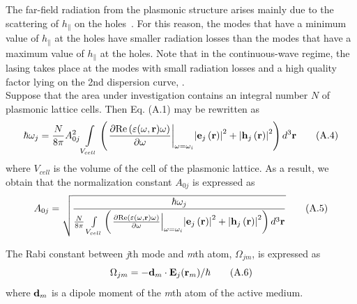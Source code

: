 \documentclass[aps,pra,amsmath,amssymb,onecolumn,superscriptaddress,showpacs,floatfix,]{revtex4-1}
\begin{document}
The far-field radiation from the plasmonic structure arises mainly due to the scattering of $h_{\parallel}$ on the holes~\cite{TennerJOpt}. 
For this reason, the modes that have a minimum value of $h_{\parallel}$ at the holes have smaller radiation losses than the modes that have a maximum value of $h_{\parallel}$ at the holes.
Note that in the continuous-wave regime, the lasing takes place at the modes with small radiation losses and a high quality factor lying on the 2nd dispersion curve, \cite{TennerJOpt,nefedkin2018acsphot}.
\\

Suppose that the area under investigation contains an integral number $N$ of plasmonic lattice cells.
Then Eq. (A.1) may be rewritten as
\begin{equation}
\hbar {\omega _j} =\frac{N}{{8\pi }} A_{0j}^2 \int\limits_{{V_{cell}}} {\left( {{{\left. {\frac{{\partial {\mathop{\rm Re}\nolimits} \left( {\varepsilon(\omega, \textbf{r}) \omega } \right)}}{{\partial \omega }}} \right|}_{\omega  = {\omega _i}}}{{\left| {{{\bf{e}}_j}\left( {\bf{r}} \right)} \right|}^2} + {{\left| {{{\bf{h}}_j}\left( {\bf{r}} \right)} \right|}^2}} \right){d^3}{\bf{r}}} \tag{A.4}
\end{equation}
where ${V_{cell}}$  is the volume of the cell of the plasmonic lattice. As a result, we obtain that the normalization constant $A_{0j}$ is expressed as
\begin{equation}
A_{0j} =\sqrt{\frac{\hbar {\omega _j}}{\frac{N}{{8\pi }} \int\limits_{{V_{cell}}} {\left( {{{\left. {\frac{{\partial {\mathop{\rm Re}\nolimits} \left( {\varepsilon(\omega, \textbf{r}) \omega } \right)}}{{\partial \omega }}} \right|}_{\omega  = {\omega _i}}}{{\left| {{{\bf{e}}_j}\left( {\bf{r}} \right)} \right|}^2} + {{\left| {{{\bf{h}}_j}\left( {\bf{r}} \right)} \right|}^2}} \right){d^3}{\bf{r}}}}} \tag{A.5}
\end{equation}

The Rabi constant between \textit{j}th mode and \textit{m}th atom, ${\Omega _{jm}}$, is expressed as
\begin{equation}
{\Omega _{jm}} =  - {{{\bf{d}}_m} \cdot {{\bf{E}}_j}({{\bf{r}}_m})/ \hbar} \tag{A.6}
\end{equation}
where ${\bf{d}}_m$ is a dipole moment of the \textit{m}th atom of the active medium.
\end{document}
